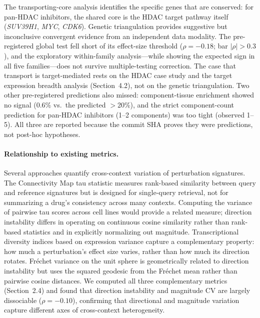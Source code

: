\documentclass[11pt]{article}
\begin{document}
The transporting-core analysis identifies the specific genes that are
conserved: for pan-HDAC inhibitors, the shared core is the HDAC target
pathway itself (\emph{SUV39H1}, \emph{MYC}, \emph{CDK6}).  Genetic
triangulation provides suggestive but inconclusive convergent evidence
from an independent data modality.  The pre-registered global test fell
short of its effect-size threshold ($\rho = -0.18$; bar $|\rho| > 0.3$),
and the exploratory within-family analysis---while showing the expected
sign in all five families---does not survive multiple-testing correction.
The case that transport is target-mediated rests on the HDAC case study
and the target expression breadth analysis (Section~4.2), not on the
genetic triangulation.  Two other pre-registered predictions also
missed: component-tissue enrichment showed no signal
(0.6\% vs.\ the predicted $>$20\%), and the strict component-count
prediction for pan-HDAC inhibitors (1--2 components) was too tight
(observed 1--5).  All three are reported because the commit SHA proves
they were predictions, not post-hoc hypotheses.

\paragraph{Relationship to existing metrics.}
Several approaches quantify cross-context variation of perturbation
signatures.  The Connectivity Map tau statistic
\citep{subramanian2017next} measures rank-based similarity between
query and reference signatures but is designed for single-query
retrieval, not for summarizing a drug's consistency across many
contexts.  Computing the variance of pairwise tau scores across cell
lines would provide a related measure; direction instability differs
in operating on continuous cosine similarity rather than rank-based
statistics and in explicitly normalizing out magnitude.  Transcriptional
diversity indices based on expression variance
\citep{haghighi2022high} capture a complementary property: how much a
perturbation's effect size varies, rather than how much its direction
rotates.  Fr\'echet variance on the unit sphere
\citep{pennec2006intrinsic} is geometrically related to direction
instability but uses the squared geodesic from the Fr\'echet mean
rather than pairwise cosine distances.  We computed all three
complementary metrics (Section~2.4) and found that direction
instability and magnitude CV are largely dissociable ($\rho = -0.10$),
confirming that directional and magnitude variation capture different
axes of cross-context heterogeneity.
\end{document}
